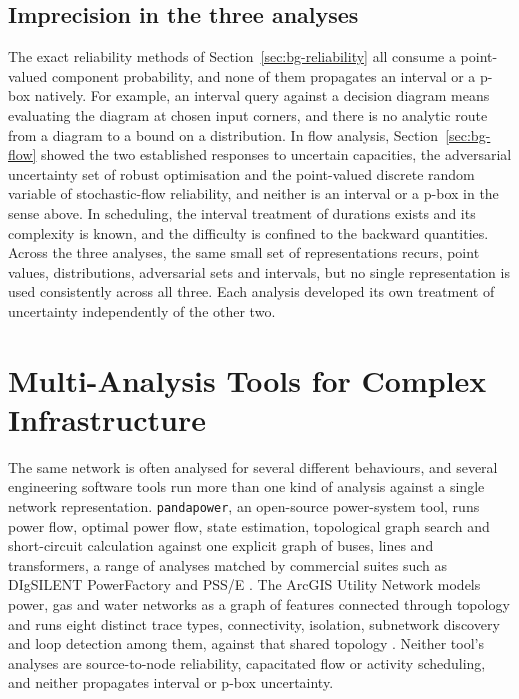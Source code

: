 \documentclass[12pt]{report}
\begin{document}
\subsection{Imprecision in the three analyses}
\label{sec:bg-imprecision-domains}

The exact reliability methods of Section~\ref{sec:bg-reliability} all consume a point-valued
component probability, and none of them propagates an interval or a p-box natively. For
example, an interval query against a decision diagram means evaluating the diagram at chosen input
corners, and there is no analytic route from a diagram to a bound on a distribution. In flow
analysis, Section~\ref{sec:bg-flow} showed the two established responses to uncertain
capacities, the adversarial uncertainty set of robust optimisation and the point-valued
discrete random variable of stochastic-flow reliability, and neither is an interval or a p-box
in the sense above. In scheduling, the interval treatment of durations exists and its
complexity is known, and the difficulty is confined to the backward quantities. Across the
three analyses, the same small set of representations recurs, point values, distributions,
adversarial sets and intervals, but no single representation is used consistently across all
three. Each analysis developed its own treatment of uncertainty independently of the other two.

\section{Multi-Analysis Tools for Complex Infrastructure}
\label{sec:bg-frameworks}

The same network is often analysed for several different behaviours, and several engineering
software tools run more than one kind of analysis against a single network representation.
\texttt{pandapower}, an open-source power-system tool, runs power flow,
optimal power flow, state estimation, topological graph search and short-circuit calculation
against one explicit graph of buses, lines and transformers, a range of analyses matched by
commercial suites such as DIgSILENT PowerFactory and PSS/E \cite{thurner2018pandapower}. The
ArcGIS Utility Network models power, gas and water networks as a graph of features connected
through topology and runs eight distinct trace types, connectivity, isolation, subnetwork
discovery and loop detection among them, against that shared topology
\cite{esri_utilitynetwork}. Neither tool's analyses are source-to-node reliability,
capacitated flow or activity scheduling, and neither propagates interval or p-box uncertainty.
\end{document}
